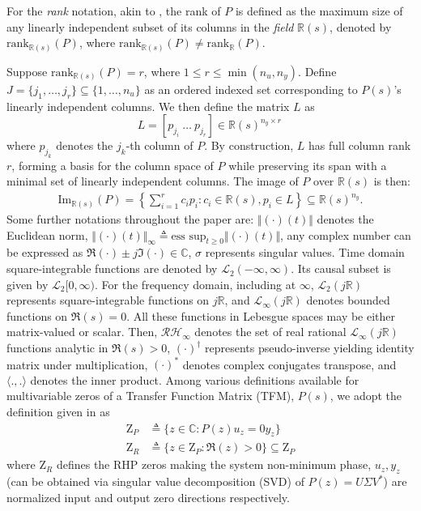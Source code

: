 \documentclass[journal]{IEEEtran}
\theoremstyle{remark}
\begin{document}
For the \textit{rank} notation, akin to \cite{antoniou2005numerical}, the rank of $P$ is defined as the maximum size of any linearly independent subset of its columns in the \textit{field} \(\mathbb{R}(s)\), denoted by \(\text{rank}_{\mathbb{R}(s)}(P)\), where \(\text{rank}_{\mathbb{R}(s)}(P) \ne \text{rank}_{\mathbb{R}}(P) \). 

Suppose $\text{rank}_{\mathbb{R}(s)}(P)=r$, where $1 \leq r \leq \min(n_u,n_y)$. {Define $J=\{j_1,\dots,j_r\} \subseteq \{1,\dots,n_u\}$ as an ordered indexed set corresponding to $P(s)$'s linearly independent columns. We then define the matrix $L$ as 
\begin{equation} \label{eq:Lind_columns_P}
{L} = [ p_{j_i} \ \dots \ p_{j_r} ]\in \mathbb{R}(s)^{n_y \times r} \, 
\end{equation}
where $p_{j_k}$ denotes the $j_k$-th column of $P$. By construction, $L$ has full column rank $r$, forming a basis for the column space of $P$ while preserving its span with a minimal set of linearly independent columns.} The image of $P$ over $\mathbb{R}(s)$ is then:
\small
\begin{align}\label{eq:spanL(P)}
\text{Im}_{\mathbb{R}(s)}(P) = \left\{ \sum_{i=1}^{r} c_i p_i : c_i \in \mathbb{R}(s), p_i \in {L} \right\} \subseteq \mathbb{R}(s)^{n_y}.
\end{align}
\normalsize
Some further notations throughout the paper are: $\Vert (\cdot)(t)\Vert$ denotes the  Euclidean norm, $\Vert (\cdot) (t) \Vert_\infty\triangleq \text{ess sup}_{t \ge 0} \Vert (\cdot)(t)\Vert$, any complex number can be expressed as $\Re(\cdot)\pm j\Im(\cdot) \in \mathbb{C}$, $\sigma$ represents singular values. Time domain square-integrable functions are denoted by $\mathcal{L}_2(-\infty, \infty)$. Its causal subset is given by $\mathcal{L}_2[0, \infty)$. For the frequency domain, including at $\infty$, $\mathcal{L}_2(j\mathbb{R})$ represents square-integrable functions on $j\mathbb{R}$, and $\mathcal{L}_\infty(j\mathbb{R})$ denotes bounded functions on $\Re(s) = 0$. All these functions in Lebesgue spaces may be either matrix-valued or scalar.
Then, $\mathcal{R}\mathcal{H}_\infty$ denotes the set of real rational $\mathcal{L}_\infty(j\mathbb{R})$ functions analytic in $\Re(s) > 0$, $(\cdot)^\dagger$ represents pseudo-inverse yielding identity matrix under multiplication, $(\cdot)^*$ denotes complex conjugates transpose, and $\langle . , . \rangle$ denotes the inner product. Among various definitions available for multivariable zeros of a Transfer Function Matrix (TFM), $P(s)$, we adopt the definition given in \cite[chapter 4.5.3]{skogestad2005multivariable} as
\begin{align} \label{eq:zerosP}
\text{Z}_P &\triangleq \{z \in \mathbb{C} : P(z)u_z=0y_z\} \\
\text{Z}_R &\triangleq  \{z \in \text{Z}_P : \Re(z) > 0\} \subseteq \text{Z}_P  \label{eq:rhpzeros}
\end{align}
where $\text{Z}_R$ defines the RHP zeros making the system non-minimum phase, $u_z,y_z$ (can be obtained via singular value decomposition (SVD) of $P(z)=U\Sigma V^*$) are normalized input and output zero directions respectively.
\end{document}
